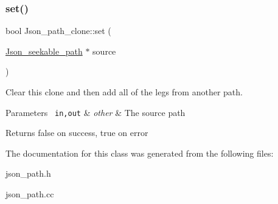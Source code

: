 \subsubsection{\texorpdfstring{set()}{set()}}
{\footnotesize\ttfamily bool Json\+\_\+path\+\_\+clone\+::set (\begin{DoxyParamCaption}\item[{\mbox{\hyperlink{classJson__seekable__path}{Json\+\_\+seekable\+\_\+path}} $\ast$}]{source }\end{DoxyParamCaption})}

Clear this clone and then add all of the legs from another path.


\begin{DoxyParams}[1]{Parameters}
\mbox{\texttt{ in,out}}  & {\em other} & The source path \\
\hline
\end{DoxyParams}
\begin{DoxyReturn}{Returns}
false on success, true on error 
\end{DoxyReturn}


The documentation for this class was generated from the following files\+:\begin{DoxyCompactItemize}
\item 
json\+\_\+path.\+h\item 
json\+\_\+path.\+cc\end{DoxyCompactItemize}
